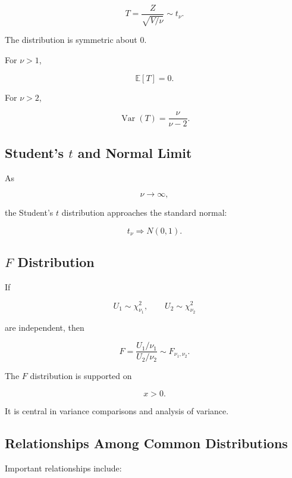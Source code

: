 \[
\boxed{
T
=
\frac{
Z
}{
\sqrt{V/\nu}
}
\sim
t_\nu.
}
\]

The distribution is symmetric about \(0\).

For \(\nu>1\),

\[
\boxed{
\mathbb{E}[T]=0.
}
\]

For \(\nu>2\),

\[
\boxed{
\operatorname{Var}(T)
=
\frac{
\nu
}{
\nu-2
}.
}
\]

\subsection{Student's \(t\) and Normal Limit}
\label{subsec:t-normal-limit-reference}

As

\[
\nu\to\infty,
\]

the Student's \(t\) distribution approaches the standard normal:

\[
\boxed{
t_\nu
\Longrightarrow
N(0,1).
}
\]

\subsection{\(F\) Distribution}
\label{subsec:f-distribution-reference}

If

\[
U_1\sim\chi_{\nu_1}^2,
\qquad
U_2\sim\chi_{\nu_2}^2
\]

are independent, then

\[
\boxed{
F
=
\frac{
U_1/\nu_1
}{
U_2/\nu_2
}
\sim
F_{\nu_1,\nu_2}.
}
\]

The \(F\) distribution is supported on

\[
\boxed{
x>0.
}
\]

It is central in variance comparisons and analysis of variance.

\subsection{Relationships Among Common Distributions}
\label{subsec:distribution-relationships-reference}

Important relationships include:

